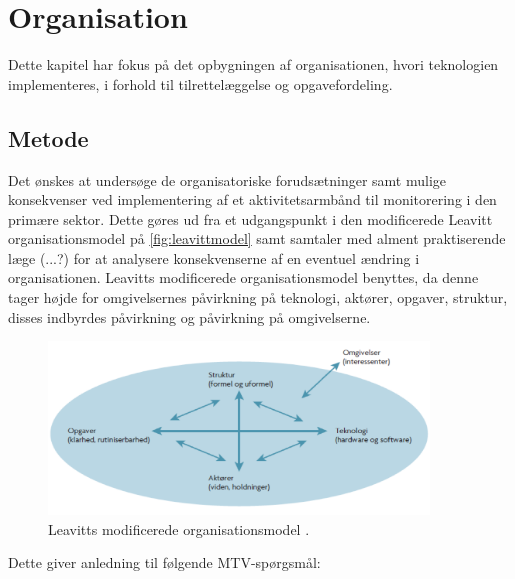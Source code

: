 \chapter{Organisation}
Dette kapitel har fokus på det opbygningen af organisationen, hvori teknologien implementeres, i forhold til tilrettelæggelse og opgavefordeling.

\section{Metode}
Det ønskes at undersøge de organisatoriske forudsætninger samt mulige konsekvenser ved implementering af et aktivitetsarmbånd til monitorering i den primære sektor. Dette gøres ud fra et udgangspunkt i den modificerede Leavitt organisationsmodel på \autoref{fig:leavittmodel} samt samtaler med alment praktiserende læge (...?) for at analysere konsekvenserne af en eventuel ændring i organisationen. Leavitts modificerede organisationsmodel benyttes, da denne tager højde for omgivelsernes påvirkning på teknologi, aktører, opgaver, struktur, disses indbyrdes påvirkning og påvirkning på omgivelserne.

\begin{figure}[H]
\centering
\includegraphics[width=0.9\textwidth]{figures/leavitt}
\caption{Leavitts modificerede organisationsmodel \citep{mtvhaandbog}.}
\label{fig:leavittmodel}
\end{figure}
\noindent
Dette giver anledning til følgende MTV-spørgsmål:

